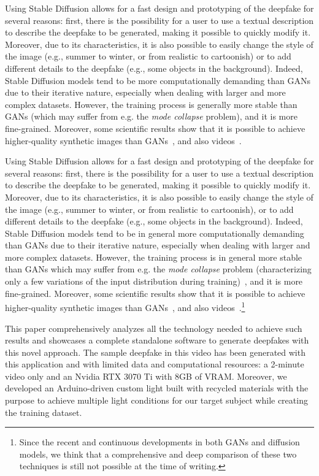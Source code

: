 \documentclass[sn-mathphys,Numbered]{sn-jnl}
\theoremstyle{thmstyleone}%
\theoremstyle{thmstyletwo}%
\theoremstyle{thmstylethree}%
\begin{document}
Using Stable Diffusion allows for a fast design and prototyping of the deepfake for several reasons: first, there is the possibility for a user to use a textual description to describe the deepfake to be generated, making it possible to quickly modify it. Moreover, due to its characteristics, it is also possible to easily change the style of the image (e.g., summer to winter, or from realistic to cartoonish) or to add different details to the deepfake (e.g., some objects in the background). Indeed, Stable Diffusion models tend to be more computationally demanding than GANs due to their iterative nature, especially when dealing with larger and more complex datasets. However, the training process is generally more stable than GANs (which may suffer from e.g. the \emph{mode collapse} problem), and  it is more fine-grained. Moreover, some scientific results show that it is possible to achieve higher-quality synthetic images than GANs~\cite{dmbetter,dmbetter2}, and also videos~\cite{dmbetter3}.

Using Stable Diffusion allows for a fast design and prototyping of the deepfake for several reasons: first, there is the possibility for a user to use a textual description to describe the deepfake to be generated, making it possible to quickly modify it. Moreover, due to its characteristics, it is also possible to easily change the style of the image (e.g., summer to winter, or from realistic to cartoonish), or to add different details to the deepfake (e.g., some objects in the background). Indeed, Stable Diffusion models tend to be in general more computationally demanding than GANs due to their iterative nature, especially when dealing with larger and more complex datasets. However, the training process is in general more stable than GANs which may suffer from e.g. the \emph{mode collapse} problem (characterizing only a few variations of the input distribution during training)~\cite{collapse}, and  it is more fine-grained. Moreover, some scientific results show that it is possible to achieve higher-quality synthetic images than GANs~\cite{dmbetter,dmbetter2}, and also videos~\cite{dmbetter3}.\footnote{Since the recent and continuous developments in both GANs and diffusion models, we think that a comprehensive and deep comparison of these two techniques is still not possible at the time of writing.}

This paper comprehensively analyzes all the technology needed to achieve such results and showcases a complete standalone software to generate deepfakes with this novel approach. The sample deepfake in this video has been generated with this application and with limited data and computational resources: a 2-minute video only and an Nvidia RTX 3070 Ti with $8$GB of VRAM. Moreover, we developed an Arduino-driven custom light built with recycled materials with the purpose to 
achieve multiple light conditions for our target subject while creating the training dataset.
\end{document}
